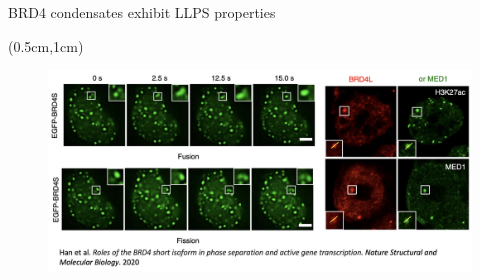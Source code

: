 \documentclass{beamer}					%
\begin{document}

\begin{frame}{BRD4 condensates exhibit LLPS properties}
\begin{textblock*}{14cm}(0.5cm,1cm)
\begin{figure}
\includegraphics[width=14cm]{Fission.png}
\end{figure}
\end{textblock*}
\end{frame}
\end{document}
